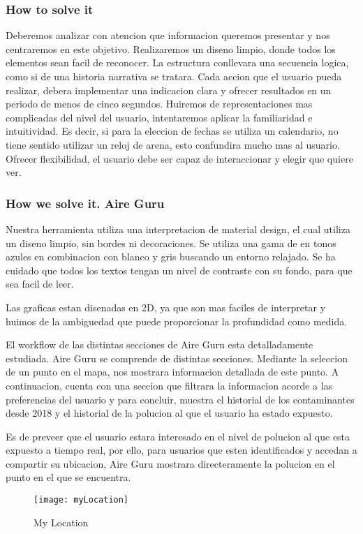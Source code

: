     
\subsubsection{How to solve it} 
Deberemos analizar con atencion que informacion queremos presentar y nos centraremos en este objetivo. Realizaremos un 
diseno limpio, donde todos los elementos sean facil de reconocer.
La estructura conllevara una secuencia logica, como si de una historia narrativa se tratara. 
Cada accion que el usuario pueda realizar, debera implementar una indicacion clara y ofrecer resultados en un 
periodo de menos de cinco segundos.
Huiremos de representaciones mas complicadas del nivel del usuario, intentaremos aplicar la familiaridad e intuitividad.
Es decir, si para la eleccion de fechas se utiliza un calendario, no tiene sentido utilizar un reloj de arena, esto confundira
mucho mas al usuario.
Ofrecer flexibilidad, el usuario debe ser capaz de interaccionar y elegir que quiere ver.

\subsubsection{How we solve it. Aire Guru} 
Nuestra herramienta utiliza una interpretacion de material design, el cual utiliza un diseno limpio, sin bordes ni decoraciones.
Se utiliza una gama de en tonos azules en combinacion con blanco y gris buscando un entorno relajado. 
Se ha cuidado que todos los textos tengan un nivel de contraste con su fondo, para que sea facil de leer.

Las graficas estan disenadas en 2D, ya que son mas faciles de interpretar y huimos de la ambiguedad que puede
proporcionar la profundidad como medida.


El workflow de las distintas secciones de Aire Guru esta detalladamente estudiada.
Aire Guru se comprende de distintas secciones. Mediante la seleccion de un punto en el mapa, nos
mostrara informacion detallada de este punto. A continuacion, cuenta con una seccion que filtrara la informacion acorde a las preferencias del usuario
y para concluir, muestra el historial de los contaminantes desde 2018 y el historial de la polucion al que el usuario ha estado
expuesto. 

Es de preveer que el usuario estara interesado en el nivel de polucion al que esta expuesto a tiempo real, por ello, para usuarios
que esten identificados y accedan a compartir su ubicacion, Aire Guru mostrara directeramente la polucion en el punto en el 
que se encuentra.
\begin{figure}[ht]
    \centering
    \texttt{[image: myLocation]}
    \caption{My Location}
\end{figure}




